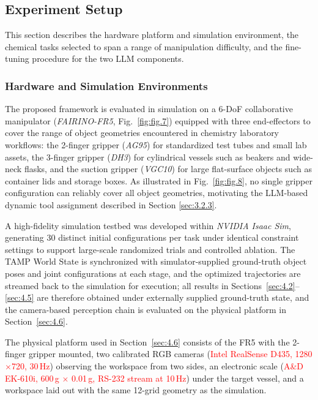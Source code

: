 \documentclass{ieeeaccess}
\newif\ifhighlight
\newcommand{\rev}[1]{\ifhighlight\hl{#1}\else#1\fi}
\newcommand{\nd}[1]{\textcolor{red}{#1}}
\begin{document}
\subsection{Experiment Setup}\label{sec:4.1}
This section describes the hardware platform and simulation environment, the chemical tasks selected to span a range of manipulation difficulty, and the fine-tuning procedure for the two LLM components.

\subsubsection{Hardware and Simulation Environments}\label{sec:4.1.1}
The proposed framework is evaluated \rev{in simulation} on a 6-DoF collaborative manipulator (\textit{FAIRINO-FR5}, Fig.~\ref{fig:fig.7}) equipped with three end-effectors to cover the range of object geometries encountered in chemistry laboratory workflows: the 2-finger gripper (\textit{AG95}) for standardized test tubes and small lab assets, the 3-finger gripper (\textit{DH3}) for cylindrical vessels such as beakers and wide-neck flasks, and the suction gripper (\textit{VGC10}) for large flat-surface objects such as container lids and storage boxes. As illustrated in Fig.~\ref{fig:fig.8}, no single gripper configuration can reliably cover all object geometries, motivating the LLM-based dynamic tool assignment described in Section \ref{sec:3.2.3}.

A high-fidelity simulation testbed was developed within \textit{NVIDIA Isaac Sim}, generating 30 distinct initial configurations per task under identical constraint settings to support large-scale randomized trials and controlled ablation. \rev{The TAMP World State is synchronized with simulator-supplied ground-truth object poses and joint configurations at each stage, and the optimized trajectories are streamed back to the simulation for execution; all results in Sections~\ref{sec:4.2}--\ref{sec:4.5} are therefore obtained under externally supplied ground-truth state, and the camera-based perception chain is evaluated on the physical platform in Section~\ref{sec:4.6}.}

\rev{The physical platform used in Section~\ref{sec:4.6} consists of the FR5 with the 2-finger gripper mounted, two calibrated RGB cameras (\nd{Intel RealSense D435, 1280$\times$720, 30\,Hz}) observing the workspace from two sides, an electronic scale (\nd{A\&D EK-610i, 600\,g $\times$ 0.01\,g, RS-232 stream at 10\,Hz}) under the target vessel, and a workspace laid out with the same 12-grid geometry as the simulation.}
\end{document}
